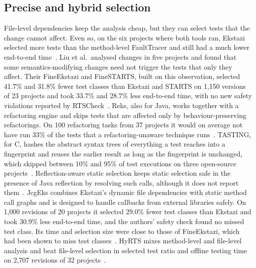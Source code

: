 \documentclass[11pt]{article}
\begin{document}
\subsection*{Precise and hybrid selection}
File-level dependencies keep the analysis cheap, but they can select tests that the change cannot affect. Even so, on the six projects where both tools ran, Ekstazi selected more tests than the method-level FaultTracer and still had a much lower end-to-end time~\cite{gligoric2015ekstazi}. Liu et al.\ analysed changes in five projects and found that some semantics-modifying changes need not trigger the tests that only they affect. Their FineEkstazi and FineSTARTS, built on this observation, selected 41.7\% and 31.8\% fewer test classes than Ekstazi and STARTS on 1,150 versions of 23 projects and took 33.7\% and 28.7\% less end-to-end time, with no new safety violations reported by RTSCheck~\cite{liu2023finerts}. Reks, also for Java, works together with a refactoring engine and skips tests that are affected only by behaviour-preserving refactorings. On 100 refactoring tasks from 37 projects it would on average not have run 33\% of the tests that a refactoring-unaware technique runs~\cite{wang2018reks}. TASTING, for C, hashes the abstract syntax trees of everything a test reaches into a fingerprint and reuses the earlier result as long as the fingerprint is unchanged, which skipped between 10\% and 95\% of test executions on three open-source projects~\cite{landsberg2022tasting}. Reflection-aware static selection keeps static selection safe in the presence of Java reflection by resolving such calls, although it does not report them~\cite{shi2019reflection}. JcgEks combines Ekstazi's dynamic file dependencies with static method call graphs and is designed to handle callbacks from external libraries safely. On 1,000 revisions of 20 projects it selected 29.0\% fewer test classes than Ekstazi and took 30.9\% less end-to-end time, and the authors' safety check found no missed test class. Its time and selection size were close to those of FineEkstazi, which had been shown to miss test classes~\cite{zhang2024jcgeks}. HyRTS mixes method-level and file-level analysis and beat file-level selection in selected test ratio and offline testing time on 2,707 revisions of 32 projects~\cite{zhang2018hyrts}.
\end{document}
